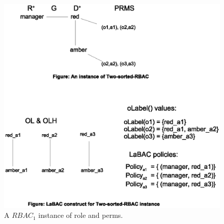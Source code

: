  \begin{figure}[!htbp]
 	\centering
 	\includegraphics[width=.6\textwidth]{two-sorted-labac-example-diagram}
 	\caption{A $RBAC_1$ instance of role and perms.}
 	\label{fig:two-sorted-labac-example-diagram}
 \end{figure}